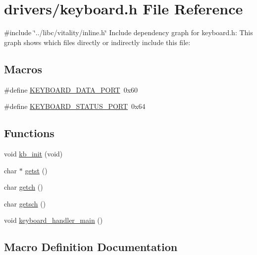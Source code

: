 \hypertarget{a00041}{}\section{drivers/keyboard.h File Reference}
\label{a00041}
{\ttfamily \#include \char`\"{}../libc/vitality/inline.\+h\char`\"{}}\newline
Include dependency graph for keyboard.\+h\+:
This graph shows which files directly or indirectly include this file\+:
\subsection*{Macros}
\begin{DoxyCompactItemize}
\item 
\#define \hyperlink{a00041_a49e0a04e81098085d2948c1e9f8c99cb_a49e0a04e81098085d2948c1e9f8c99cb}{K\+E\+Y\+B\+O\+A\+R\+D\+\_\+\+D\+A\+T\+A\+\_\+\+P\+O\+RT}~0x60
\item 
\#define \hyperlink{a00041_ab79ca089665bc7f5cc151883d1bc69ed_ab79ca089665bc7f5cc151883d1bc69ed}{K\+E\+Y\+B\+O\+A\+R\+D\+\_\+\+S\+T\+A\+T\+U\+S\+\_\+\+P\+O\+RT}~0x64
\end{DoxyCompactItemize}
\subsection*{Functions}
\begin{DoxyCompactItemize}
\item 
void \hyperlink{a00041_aabdb223e5290f3b3c07bc82d075b87d7_aabdb223e5290f3b3c07bc82d075b87d7}{kb\+\_\+init} (void)
\item 
char $\ast$ \hyperlink{a00041_ab88a2e96bbe585e228a5b201435c0240_ab88a2e96bbe585e228a5b201435c0240}{getst} ()
\item 
char \hyperlink{a00041_af3facad10e05defa48d45b46eb9ebe7e_af3facad10e05defa48d45b46eb9ebe7e}{getch} ()
\item 
char \hyperlink{a00041_aa7ee03b27a489828ce588d0fc023cab3_aa7ee03b27a489828ce588d0fc023cab3}{getsch} ()
\item 
void \hyperlink{a00041_adffe6abc4a32b3b10985ec9324bce2af_adffe6abc4a32b3b10985ec9324bce2af}{keyboard\+\_\+handler\+\_\+main} ()
\end{DoxyCompactItemize}


\subsection{Macro Definition Documentation}
\mbox{\label{a00041_a49e0a04e81098085d2948c1e9f8c99cb_a49e0a04e81098085d2948c1e9f8c99cb}} 
